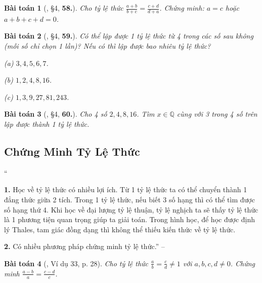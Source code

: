 \documentclass{article}
\numberwithin{equation}{section}
\newtheorem{baitoan}{Bài toán}
\begin{document}
\begin{baitoan}[\cite{Binh_Toan_7_tap_1}, \S4, \textbf{58.}]
	Cho tỷ lệ thức $\frac{a + b}{b + c} = \frac{c + d}{d + a}$. Chứng minh: $a = c$ hoặc $a + b + c + d = 0$.
\end{baitoan}

\begin{baitoan}[\cite{Binh_Toan_7_tap_1}, \S4, \textbf{59.}]
	Có thể lập được 1 tỷ lệ thức từ 4 trong các số sau không (mỗi số chỉ chọn 1 lần)? Nếu có thì lập được bao nhiêu tỷ lệ thức?
	\begin{enumerate*}
		\item[(a)] $3,4,5,6,7$.
		\item[(b)] $1,2,4,8,16$.
		\item[(c)] $1,3,9,27,81,243$.
	\end{enumerate*}
\end{baitoan}

\begin{baitoan}[\cite{Binh_Toan_7_tap_1}, \S4, \textbf{60.}]
	Cho 4 số $2,4,8,16$. Tìm $x\in\mathbb{Q}$ cùng với 3 trong 4 số trên lập được thành 1 tỷ lệ thức.
\end{baitoan}


\subsection{Chứng Minh Tỷ Lệ Thức}
``\begin{enumerate*}
	\item[\textbf{1.}] Học về tỷ lệ thức có nhiều lợi ích. Từ 1 tỷ lệ thức ta có thể chuyển thành 1 đẳng thức giữa 2 tích. Trong 1 tỷ lệ thức, nếu biết 3 số hạng thì có thể tìm được số hạng thứ 4. Khi học về đại lượng tỷ lệ thuận, tỷ lệ nghịch ta sẽ thấy tỷ lệ thức là 1 phương tiện quan trọng giúp ta giải toán. Trong hình học, để học được định lý Thales, tam giác đồng dạng thì không thể thiếu kiến thức về tỷ lệ thức.
	\item[\textbf{2.}] Có nhiều phương pháp chứng minh tỷ lệ thức.'' -- \cite[Chap. 2, \S6, p. 28]{Tuyen_Toan_7}
\end{enumerate*}

\begin{baitoan}[\cite{Tuyen_Toan_7}, Ví dụ 33, p. 28]
	Cho tỷ lệ thức $\frac{a}{b} = \frac{c}{d}\ne 1$ với $a,b,c,d\ne 0$. Chứng minh $\frac{a - b}{a} = \frac{c - d}{c}$.
\end{baitoan}
\end{document}
